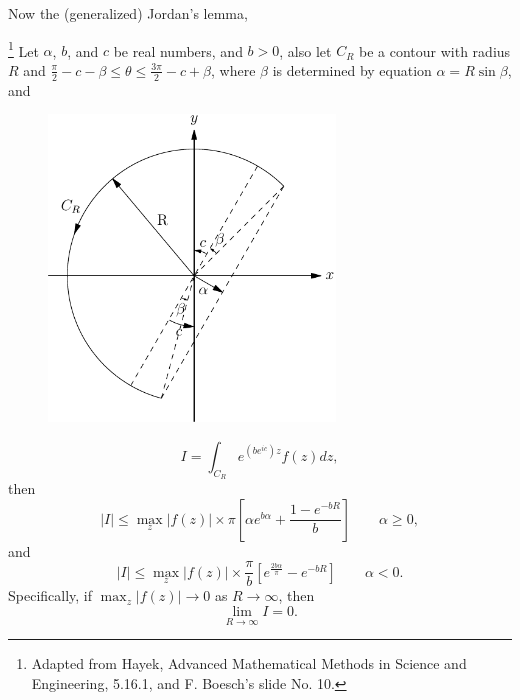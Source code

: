 Now the (generalized) Jordan's lemma,
\begin{lemma} \label{L:jordan}
\footnote{Adapted from Hayek, Advanced Mathematical Methods in Science and
    Engineering, 5.16.1, and F. Boesch's slide No. 10.}
Let $\alpha$, $b$, and $c$ be real numbers, and $b>0$, also let $C_R$ be a 
contour with radius $R$ and 
$\frac{\pi}{2}-c-\beta\le\theta\le\frac{3\pi}{2}-c+\beta$, where 
$\beta$ is determined by equation $\alpha=R\sin{\beta}$, and 

\begin{figure} \label{F:cont1}
  \includegraphics[width=3in]{graphics/contour_jordan.pdf}
\end{figure}

\[
  I=\int_{C_R} e^{(be^{ic}) z} f(z) dz,
\]
then
\begin{equation} \label{E:jordan1}
  |I|\le \max_z |f(z)| \times \pi 
         \left[ \alpha e^{b\alpha}+\frac{1-e^{-bR}}{b} \right]
         \qquad \alpha\ge 0,
\end{equation}
and 
\begin{equation} \label{E:jordan2}
  |I|\le \max_z |f(z)| \times \frac{\pi}{b}
         \left[ e^{\frac{2b\alpha}{\pi}} - e^{-bR} \right]
         \qquad \alpha<0.
\end{equation}
Specifically, if $\max_z |f(z)|\to 0$ as $R\to \infty$, then
\[
  \lim_{R\to \infty} I = 0.
\]
\end{lemma}
